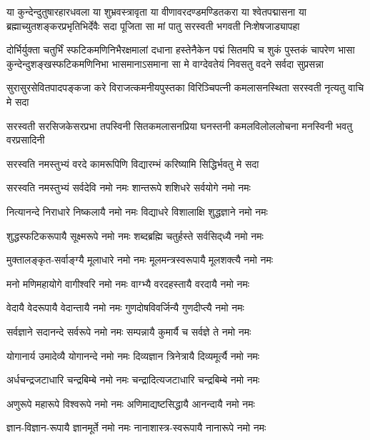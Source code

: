 

\fourlineindentedshloka
{या कुन्देन्दुतुषारहारधवला या शुभ्रवस्त्रावृता}
{या वीणावरदण्डमण्डितकरा या श्वेतपद्मासना}
{या ब्रह्माच्युतशङ्करप्रभृतिभिर्देवैः सदा पूजिता }
{सा मां पातु सरस्वती भगवती निःशेषजाड्यापहा}

\fourlineindentedshloka
{दोर्भिर्युक्ता चतुर्भिं स्फटिकमणिनिभैरक्षमालां दधाना}
{हस्तेनैकेन पद्मं सितमपि च शुकं पुस्तकं चापरेण}
{भासा कुन्देन्दुशङ्खस्फटिकमणिनिभा भासमानाऽसमाना}
{सा मे वाग्देवतेयं निवसतु वदने सर्वदा सुप्रसन्ना}

\fourlineindentedshloka
{सुरासुरसेवितपादपङ्कजा}
{करे विराजत्कमनीयपुस्तका}
{विरिञ्चिपत्नी कमलासनस्थिता}
{सरस्वती नृत्यतु वाचि मे सदा}

\fourlineindentedshloka
{सरस्वती सरसिजकेसरप्रभा}
{तपस्विनी सितकमलासनप्रिया}
{घनस्तनी कमलविलोललोचना}
{मनस्विनी भवतु वरप्रसादिनी}

\twolineshloka
{सरस्वति नमस्तुभ्यं वरदे कामरूपिणि}
{विद्यारम्भं करिष्यामि सिद्धिर्भवतु मे सदा}

\twolineshloka
{सरस्वति नमस्तुभ्यं सर्वदेवि नमो नमः}
{शान्तरूपे शशिधरे सर्वयोगे नमो नमः}

\twolineshloka
{नित्यानन्दे निराधारे निष्कलायै नमो नमः}
{विद्याधरे विशालाक्षि शुद्धज्ञाने नमो नमः}

\twolineshloka
{शुद्धस्फटिकरूपायै सूक्ष्मरूपे नमो नमः}
{शब्दब्रह्मि चतुर्हस्ते सर्वसिद्‌ध्यै नमो नमः}

\twolineshloka
{मुक्तालङ्कृत-सर्वाङ्ग्यै मूलाधारे नमो नमः}
{मूलमन्त्रस्वरूपायै मूलशक्त्यै नमो नमः}

\twolineshloka
{मनो मणिमहायोगे वागीश्वरि नमो नमः}
{वाग्भ्यै वरदहस्तायै वरदायै नमो नमः}

\twolineshloka
{वेदायै वेदरूपायै वेदान्तायै नमो नमः}
{गुणदोषविवर्जिन्यै गुणदीप्त्यै नमो नमः}

\twolineshloka
{सर्वज्ञाने सदानन्दे सर्वरूपे नमो नमः}
{सम्पन्नायै कुमार्यै च सर्वज्ञे ते नमो नमः}

\twolineshloka
{योगानार्य उमादेव्यै योगानन्दे नमो नमः}
{दिव्यज्ञान त्रिनेत्रायै दिव्यमूर्त्यै नमो नमः}

\twolineshloka
{अर्धचन्द्रजटाधारि चन्द्रबिम्बे नमो नमः}
{चन्द्रादित्यजटाधारि चन्द्रबिम्बे नमो नमः}

\twolineshloka
{अणुरूपे महारूपे विश्वरूपे नमो नमः}
{अणिमाद्यष्टसिद्धायै आनन्दायै नमो नमः}

\twolineshloka
{ज्ञान-विज्ञान-रूपायै ज्ञानमूर्ते नमो नमः}
{नानाशास्त्र-स्वरूपायै नानारूपे नमो नमः}

